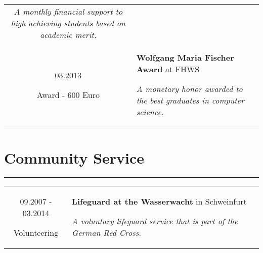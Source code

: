 \documentclass[10pt]{article}
\begin{document}
\begin{tabular}{C Z D}
{		\vspace{0.05cm}
		
		{\scriptsize \it A monthly financial support to high achieving students based on academic merit.}
		
		\vspace{0.0cm}
	}
	\\
	{
		03.2013
		
		\vspace{-0.05cm}
		
		{\scriptsize Award - \(600\) Euro}
	}
	&
	{
		{\bf Wolfgang Maria Fischer Award} {\scriptsize at FHWS}
		
		\vspace{0.05cm}
		
		{\scriptsize \it A monetary honor awarded to the best graduates in computer science.}
	}
	\\
\end{tabular}

\section*{Community Service}
\vspace{-0.3cm}
{\color{E6E6E6} \hrule height 0.04cm}
\vspace{0.4cm}
\renewcommand{\arraystretch}{1.0}
\begin{tabular}{C Z D}
	{
		09.2007 - 03.2014
		
		\vspace{-0.05cm}
		
		{\scriptsize Volunteering}
	}
	&
	{
		{\bf Lifeguard at the Wasserwacht} {\scriptsize in Schweinfurt}
		
		\vspace{0.05cm}
		
		{\scriptsize \it A voluntary lifeguard service that is part of the German Red Cross.}
	}
	\\
\end{tabular}
\end{document}
